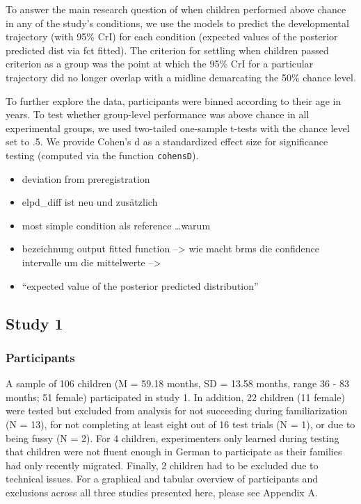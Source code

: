 \documentclass[
  man]{apa6}
\providecommand{\tightlist}{%
  \setlength{\itemsep}{0pt}\setlength{\parskip}{0pt}}
\begin{document}
To answer the main research question of when children performed above chance in any of the study's conditions, we use the models to predict the developmental trajectory (with 95\% CrI) for each condition (expected values of the posterior predicted dist via fct fitted). The criterion for settling when children passed criterion as a group was the point at which the 95\% CrI for a particular trajectory did no longer overlap with a midline demarcating the 50\% chance level.

To further explore the data, participants were binned according to their age in years. To test whether group-level performance was above chance in all experimental groups, we used two-tailed one-sample t-tests with the chance level set to .5. We provide Cohen's d as a standardized effect size for significance testing (computed via the function \texttt{cohensD}).

\begin{itemize}
\tightlist
\item
  deviation from preregistration
\item
  elpd\_diff ist neu und zusätzlich
\item
  most simple condition als reference \ldots warum
\item
  bezeichnung output fitted function --\textgreater{} wie macht brms die confidence intervalle um die mittelwerte --\textgreater{}
\item
  ``expected value of the posterior predicted distribution''
\end{itemize}

\subsection{Study 1}\label{study-1}

\subsubsection{Participants}\label{participants}

A sample of 106 children (M = 59.18 months, SD = 13.58 months, range 36 - 83 months; 51 female) participated in study 1. In addition, 22 children (11 female) were tested but excluded from analysis for not succeeding during familiarization (N = 13), for not completing at least eight out of 16 test trials (N = 1), or due to being fussy (N = 2). For 4 children, experimenters only learned during testing that children were not fluent enough in German to participate as their families had only recently migrated. Finally, 2 children had to be excluded due to technical issues. For a graphical and tabular overview of participants and exclusions across all three studies presented here, please see Appendix A.
\end{document}

